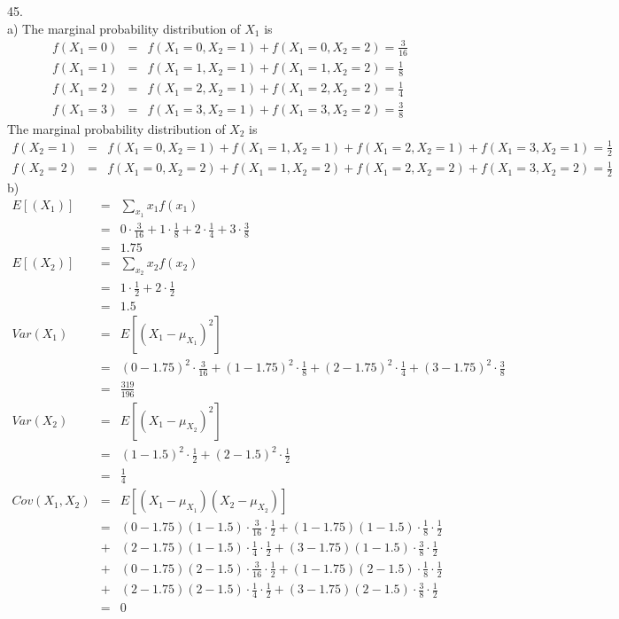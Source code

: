 \documentclass[12pt]{article}
\begin{document}
45. \\
a) The marginal probability distribution of $X_1$ is
\begin{eqnarray*}
  f(X_1 = 0) &=& f(X_1 = 0, X_2 = 1) + f(X_1 = 0, X_2 = 2) = \frac {3}{16} \\ 
  f(X_1 = 1) &=& f(X_1 = 1, X_2 = 1) + f(X_1 = 1, X_2 = 2) = \frac {1}{8} \\ 
  f(X_1 = 2) &=& f(X_1 = 2, X_2 = 1) + f(X_1 = 2, X_2 = 2) = \frac {1}{4} \\ 
  f(X_1 = 3) &=& f(X_1 = 3, X_2 = 1) + f(X_1 = 3, X_2 = 2) = \frac {3}{8}
\end{eqnarray*}
The marginal probability distribution of $X_2$ is
\begin{eqnarray*}
  f(X_2 = 1) &=& f(X_1 = 0, X_2 = 1) + f(X_1 = 1, X_2 = 1) 
    + f(X_1 = 2, X_2 = 1) + f(X_1 = 3, X_2 = 1) = \frac {1}{2} \\ 
  f(X_2 = 2) &=& f(X_1 = 0, X_2 = 2) + f(X_1 = 1, X_2 = 2)
    + f(X_1 = 2, X_2 = 2) + f(X_1 = 3, X_2 = 2) = \frac {1}{2}
\end{eqnarray*}
b)
\begin{eqnarray*}
  E[(X_1)] &=& \sum_{x_1} x_1 f(x_1) \\
           &=& 0 \cdot \frac {3}{16} + 1 \cdot \frac{1}{8}
               + 2 \cdot \frac {1}{4} + 3 \cdot \frac{3}{8} \\
           &=& 1.75 \\
  E[(X_2)] &=& \sum_{x_2} x_2 f(x_2) \\
           &=& 1 \cdot \frac{1}{2} + 2 \cdot \frac {1}{2} \\
           &=& 1.5 \\
  Var(X_1) &=& E[(X_1 - \mu_{X_1})^2] \\
           &=& (0 - 1.75)^2 \cdot \frac {3}{16}
               + (1 - 1.75)^2 \cdot \frac {1}{8}
               + (2 - 1.75)^2 \cdot \frac {1}{4}
               + (3 - 1.75)^2 \cdot \frac {3}{8} \\
           &=& \frac {319}{196} \\
  Var(X_2) &=& E[(X_1 - \mu_{X_2})^2] \\
           &=& (1 - 1.5)^2 \cdot \frac {1}{2}
               + (2 - 1.5)^2 \cdot \frac {1}{2} \\
           &=& \frac {1}{4} \\
  Cov(X_1, X_2)
  &=& E[(X_1 - \mu_{X_1})(X_2 - \mu_{X_2})] \\
  &=& (0 - 1.75)(1 - 1.5) \cdot \frac {3}{16} \cdot \frac {1}{2}
      + (1 - 1.75)(1 - 1.5) \cdot \frac {1}{8} \cdot \frac {1}{2} \\
  &+& (2 - 1.75)(1 - 1.5) \cdot \frac {1}{4} \cdot \frac {1}{2}
      + (3 - 1.75)(1 - 1.5) \cdot \frac {3}{8} \cdot \frac {1}{2} \\
  &+& (0 - 1.75)(2 - 1.5) \cdot \frac {3}{16} \cdot \frac {1}{2}
      + (1 - 1.75)(2 - 1.5) \cdot \frac {1}{8} \cdot \frac {1}{2} \\
  &+& (2 - 1.75)(2 - 1.5) \cdot \frac {1}{4} \cdot \frac {1}{2}
      + (3 - 1.75)(2 - 1.5) \cdot \frac {3}{8} \cdot \frac {1}{2} \\
  &=& 0
\end{eqnarray*}
\end{document}
